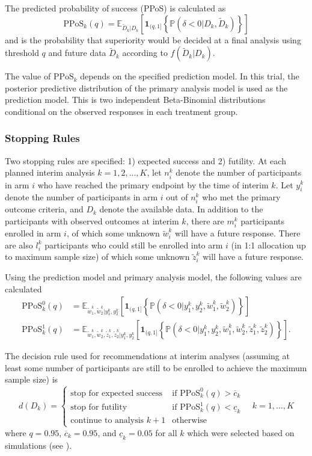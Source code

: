 \documentclass{bmcart}
\begin{document}
The predicted probability of success (PPoS) \cite{berry2010bayesian} is calculated as
$$
\text{PPoS}_k(q) = \mathbb E_{\tilde D_k | D_k}\left[\textbf{1}_{(q,1]}\left\{\mathbb P(\delta<0|D_k,\tilde D_k)\right\}\right]
$$
and is the probability that superiority would be decided at a final analysis using threshold $q$ and future data $\tilde D_k$ according to $f(\tilde D_k|D_k)$.

The value of \(\text{PPoS}_k\) depends on the specified prediction model.
In this trial, the posterior predictive distribution of the primary analysis model is used as the prediction model.
This is two independent Beta-Binomial distributions conditional on the observed responses in each treatment group.

\subsubsection*{Stopping Rules}

Two stopping rules are specified: 1) expected success and 2) futility.
At each planned interim analysis $k=1,2,...,K$, let $n_i^k$ denote the number of participants in arm $i$ who have reached the primary endpoint by the time of interim $k$.
Let $y_i^k$ denote the number of participants in arm $i$ out of $n_i^k$ who met the primary outcome criteria, and $D_k$ denote the available data.
In addition to the participants with observed outcomes at interim $k$, there are $m_i^k$ participants enrolled in arm $i$, of which some unknown $\tilde w_i^k$ will have a future response. There are also $l_i^k$ participants who could still be enrolled into arm $i$ (in 1:1 allocation up to maximum sample size) of which some unknown $\tilde z_i^k$ will have a future response.

Using the prediction model and primary analysis model, the following values are calculated
$$
\begin{aligned}
\text{PPoS}_k^0(q) &= \mathbb E_{\tilde w_1^k,\tilde w_2^k|y_1^k,y_2^k}\left[\textbf{1}_{(q,1]}\left\{\mathbb P\left(\delta<0|y_1^k,y_2^k,\tilde w_1^k,\tilde w_2^k\right)\right\}\right] \\
\text{PPoS}_k^1(q) &= \mathbb E_{\tilde w_1^k,\tilde w_2^k,\tilde z_1^k,\tilde z_2^k|y_1^k,y_2^k}\left[\textbf{1}_{(q,1]}\left\{\mathbb P\left(\delta<0|y_1^k,y_2^k,\tilde w_1^k,\tilde w_2^k,\tilde z_1^k,\tilde z_2^k\right)\right\}\right].
\end{aligned}
$$

The decision rule used for recommendations at interim analyses (assuming at least some number of participants are still to be enrolled to achieve the maximum sample size) is
$$
d(D_k)=\begin{cases}
\text{stop for expected success} & \text{if } \text{PPoS}_k^0(q) > \overline{c}_k \\
\text{stop for futility} & \text{if } \text{PPoS}_k^1(q) < \underline{c}_k \\
\text{continue to analysis }k+1 &\text{otherwise}
\end{cases} \quad k=1,...,K
$$
where $q=0.95$, $\overline{c}_k=0.95$, and $\underline{c}_k=0.05$ for all $k$ which were selected based on simulations (see ).
\end{document}
